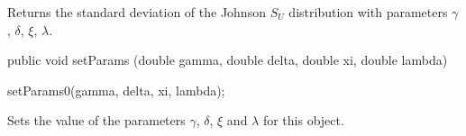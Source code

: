 \begin{tabb}  Returns the standard deviation of the Johnson $S_U$
   distribution with parameters $\gamma$, $\delta$, $\xi$, $\lambda$.
\end{tabb}
\begin{htmlonly}
\end{htmlonly}
\begin{code}

   public void setParams (double gamma, double delta,
                          double xi, double lambda)\begin{hide} {
      setParams0(gamma, delta, xi, lambda);
   }\end{hide}
\end{code}
  \begin{tabb}
  Sets the value of the parameters $\gamma$, $\delta$, $\xi$ and
  $\lambda$ for this object.
 \end{tabb}

\begin{code}\begin{hide}
}\end{hide}
\end{code}

